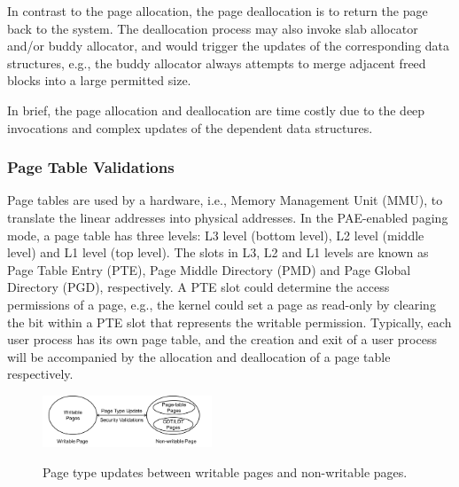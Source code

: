 In contrast to the page allocation, the page deallocation is to return the page back to the system.
The deallocation process may also invoke slab allocator and/or buddy allocator, and would trigger the updates of the corresponding data structures,
e.g., the buddy allocator always attempts to merge adjacent freed blocks into a large permitted size.

In brief, the page allocation and deallocation are time costly due to the deep invocations and complex updates of the dependent data structures.


\subsubsection{Page Table Validations}\label{sec:pv-security}
Page tables are used by a hardware, i.e., Memory Management Unit (MMU), to translate the linear addresses into physical addresses.
In the PAE-enabled paging mode, a page table has three levels: L3 level (bottom level), L2 level (middle level) and L1 level (top level).
The slots in L3, L2 and L1 levels are known as Page Table Entry (PTE), Page Middle Directory (PMD) and Page Global Directory (PGD), respectively.
A PTE slot could determine the access permissions of a page, e.g., the kernel could set a page as read-only by clearing the bit within a PTE slot that represents the writable permission.
Typically, each user process has its own page table, and the creation and exit of a user process will be accompanied by the allocation and deallocation of a page table respectively.
\begin{figure}[ht]
\centering
\includegraphics[width=0.45\textwidth]{image/background/page-type-update.png} \\
\caption{Page type updates between writable pages and non-writable pages. }
\label{fig:page-type-updates}
\end{figure}



